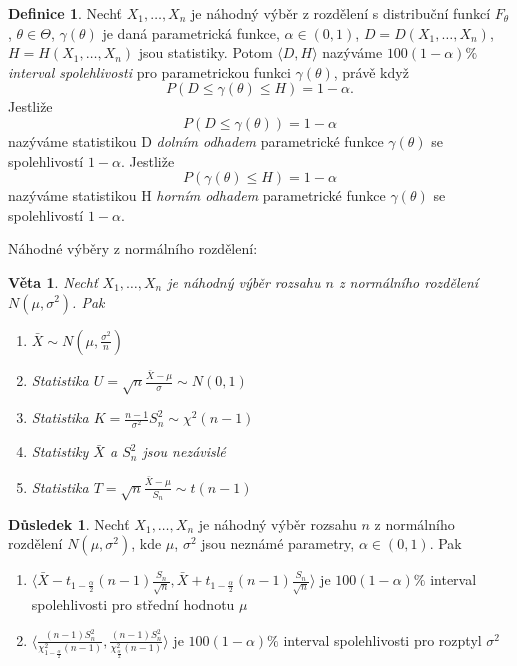\documentclass[a4]{report}
\newtheorem{theorem}{Věta}
\theoremstyle{definition}
\newtheorem{definition}{Definice}[section]
\newtheorem{dusledek}{Důsledek}[section]
\begin{document}
{\begin{definition}
Nechť $X_1,\ldots,X_n$ je náhodný výběr z rozdělení s distribuční funkcí $F_{\theta}$, $\theta \in \Theta$, $ \gamma \left(\theta \right)$ je daná parametrická funkce, $\alpha \in \left(0,1 \right)$, $D=D \left(X_1,\ldots,X_n \right)$, $H=H \left(X_1,\ldots,X_n \right)$ jsou statistiky. Potom $\langle D,H \rangle$ nazýváme $100(1-\alpha)\%$ \textit{interval spolehlivosti} pro parametrickou funkci $\gamma \left(\theta \right)$, právě když $$P\left(D \leq \gamma \left(\theta \right) \leq H \right) = 1-\alpha.$$ Jestliže  $$P\left(D \leq \gamma \left(\theta \right) \right) = 1-\alpha$$ nazýváme statistikou D \textit{dolním odhadem} parametrické funkce $\gamma \left(\theta \right)$ se spolehlivostí $1-\alpha$. Jestliže  $$P\left( \gamma \left(\theta \right) \leq H \right) = 1-\alpha$$ nazýváme statistikou H \textit{horním odhadem} parametrické funkce $\gamma \left(\theta \right)$ se spolehlivostí $1-\alpha$. 
\end{definition}

Náhodné výběry z normálního rozdělení:
\begin{theorem}
Nechť $X_1,\ldots,X_n$ je náhodný výběr rozsahu $n$ z normálního rozdělení $N\left(\mu,\sigma^2 \right)$. Pak \begin{enumerate}
\item $\bar{X} \sim N\left(\mu,\frac{\sigma^2}{n} \right)$
\item Statistika $U = \sqrt{n}\frac{\bar{X}-\mu}{\sigma} \sim N\left(0,1 \right)$
\item Statistika $K = \frac{n-1}{\sigma^2} S_{n}^{2} \sim \chi^2 \left(n-1 \right)$
\item Statistiky $\bar{X}$ a $S_{n}^{2}$ jsou nezávislé
\item Statistika $T = \sqrt{n}\frac{\bar{X}-\mu}{S_n} \sim t\left(n-1 \right)$
\end{enumerate}
\end{theorem}

\begin{dusledek}
Nechť $X_1,\ldots,X_n$ je náhodný výběr rozsahu $n$ z normálního rozdělení $N\left(\mu,\sigma^2 \right)$, kde $\mu$, $\sigma^2$ jsou neznámé parametry, $\alpha \in \left(0,1 \right)$. Pak \begin{enumerate}
\item $\langle \bar{X} - t_{1-\frac{\alpha}{2}} \left(n-1 \right)\frac{S_n}{\sqrt{n}}, \bar{X} + t_{1-\frac{\alpha}{2}} \left(n-1 \right)\frac{S_n}{\sqrt{n}} \rangle$ je $100\left(1-\alpha \right)\%$ interval spolehlivosti pro střední hodnotu $\mu$
\item $\langle \frac{\left(n-1 \right) S_{n}^{2}}{\chi_{1-\frac{\alpha}{2}}^{2} \left(n-1 \right)}, \frac{\left(n-1 \right) S_{n}^{2}}{\chi_{\frac{\alpha}{2}}^{2} \left(n-1 \right)} \rangle$ je $100\left(1-\alpha \right)\%$ interval spolehlivosti pro rozptyl $\sigma^2$
\end{enumerate} 
\end{dusledek}

}
\end{document}
